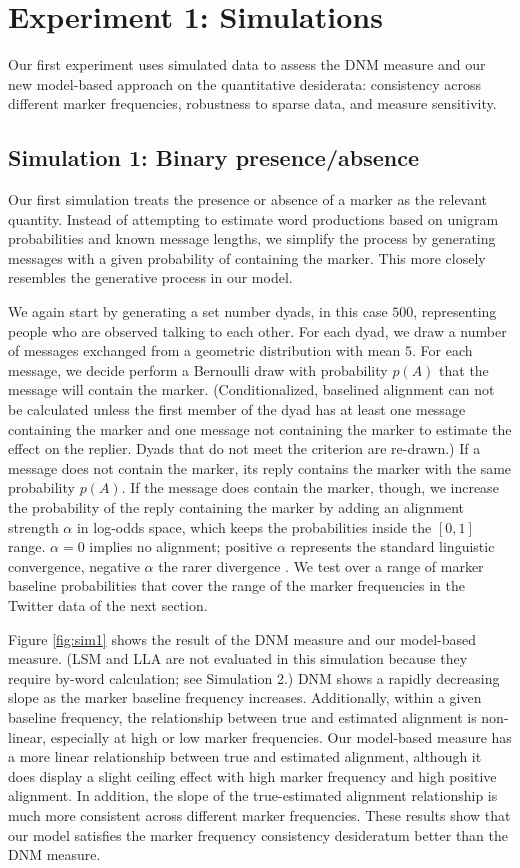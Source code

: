 \documentclass{acm_proc_article-sp}
\begin{document}
\section{Experiment 1: Simulations}
Our first experiment uses simulated data to assess the DNM measure and our new model-based approach on the quantitative desiderata: consistency across different marker frequencies, robustness to sparse data, and measure sensitivity.

\subsection{Simulation 1: Binary presence/absence}
Our first simulation treats the presence or absence of a marker as the relevant quantity. Instead of attempting to estimate word productions based on unigram probabilities and known message lengths, we simplify the process by generating messages with a given probability of containing the marker.  This more closely resembles the generative process in our model.

We again start by generating a set number dyads, in this case $500$, representing people who are observed talking to each other. For each dyad, we draw a number of messages exchanged from a geometric distribution with mean $5$. For each message, we decide perform a Bernoulli draw with probability $p(A)$ that the message will contain the marker.  (Conditionalized, baselined alignment can not be calculated unless the first member of the dyad has at least one message containing the marker and one message not containing the marker to estimate the effect on the replier. Dyads that do not meet the criterion are re-drawn.) If a message does not contain the marker, its reply contains the marker with the same probability $p(A)$. If the message does contain the marker, though, we increase the probability of the reply containing the marker by adding an alignment strength $\alpha$ in log-odds space, which keeps the probabilities inside the $[0,1]$ range. $\alpha = 0$ implies no alignment; positive $\alpha$ represents the standard linguistic convergence, negative $\alpha$ the rarer divergence \cite{Ferrera1991}.  We test over a range of marker baseline probabilities that cover the range of the marker frequencies in the Twitter data of the next section. 

Figure \ref{fig:sim1} shows the result of the DNM measure and our model-based measure.  (LSM and LLA are not evaluated in this simulation because they require by-word calculation; see Simulation 2.) DNM shows a rapidly decreasing slope as the marker baseline frequency increases.  Additionally, within a given baseline frequency, the relationship between true and estimated alignment is non-linear, especially at high or low marker frequencies.  Our model-based measure has a more linear relationship between true and estimated alignment, although it does display a slight ceiling effect with high marker frequency and high positive alignment.  In addition, the slope of the true-estimated alignment relationship is much more consistent across different marker frequencies.  These results show that our model satisfies the marker frequency consistency desideratum better than the DNM measure.
\end{document}

